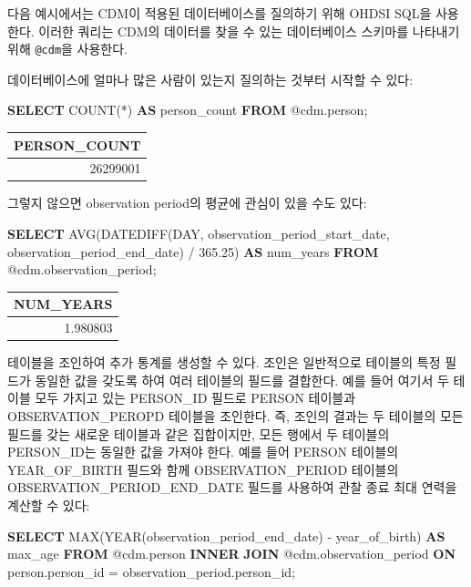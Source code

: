 \documentclass[11pt]{book}
\newenvironment{Shaded}{\begin{snugshade}}{\end{snugshade}}
\newcommand{\KeywordTok}[1]{\textcolor[rgb]{0.13,0.29,0.53}{\textbf{#1}}}
\newcommand{\DataTypeTok}[1]{\textcolor[rgb]{0.13,0.29,0.53}{#1}}
\newcommand{\FloatTok}[1]{\textcolor[rgb]{0.00,0.00,0.81}{#1}}
\newcommand{\FunctionTok}[1]{\textcolor[rgb]{0.00,0.00,0.00}{#1}}
\newcommand{\NormalTok}[1]{#1}
\theoremstyle{definition}
\theoremstyle{definition}
\theoremstyle{definition}
\theoremstyle{remark}
\begin{document}
다음 예시에서는 CDM이 적용된 데이터베이스를 질의하기 위해 OHDSI SQL을
사용한다. 이러한 쿼리는 CDM의 데이터를 찾을 수 있는 데이터베이스
스키마를 나타내기 위해 \texttt{@cdm}을 사용한다.

데이터베이스에 얼마나 많은 사람이 있는지 질의하는 것부터 시작할 수 있다:

\begin{Shaded}
\begin{Highlighting}[]
\KeywordTok{SELECT} \FunctionTok{COUNT}\NormalTok{(*) }\KeywordTok{AS}\NormalTok{ person_count }\KeywordTok{FROM}\NormalTok{ @cdm.person;}
\end{Highlighting}
\end{Shaded}

\begin{longtable}[]{@{}r@{}}
\toprule
PERSON\_COUNT\tabularnewline
\midrule
\endhead
26299001\tabularnewline
\bottomrule
\end{longtable}

그렇지 않으면 observation period의 평균에 관심이 있을 수도 있다:

\begin{Shaded}
\begin{Highlighting}[]
\KeywordTok{SELECT} \FunctionTok{AVG}\NormalTok{(DATEDIFF(}\DataTypeTok{DAY}\NormalTok{, }
\NormalTok{                    observation_period_start_date, }
\NormalTok{                    observation_period_end_date) / }\FloatTok{365.25}\NormalTok{) }\KeywordTok{AS}\NormalTok{ num_years}
\KeywordTok{FROM}\NormalTok{ @cdm.observation_period;}
\end{Highlighting}
\end{Shaded}

\begin{longtable}[]{@{}r@{}}
\toprule
NUM\_YEARS\tabularnewline
\midrule
\endhead
1.980803\tabularnewline
\bottomrule
\end{longtable}

테이블을 조인하여 추가 통계를 생성할 수 있다. 조인은 일반적으로 테이블의
특정 필드가 동일한 값을 갖도록 하여 여러 테이블의 필드를 결합한다. 예를
들어 여기서 두 테이블 모두 가지고 있는 PERSON\_ID 필드로 PERSON 테이블과
OBSERVATION\_PEROPD 테이블을 조인한다. 즉, 조인의 결과는 두 테이블의
모든 필드를 갖는 새로운 테이블과 같은 집합이지만, 모든 행에서 두
테이블의 PERSON\_ID는 동일한 값을 가져야 한다. 예를 들어 PERSON 테이블의
YEAR\_OF\_BIRTH 필드와 함께 OBSERVATION\_PERIOD 테이블의
OBSERVATION\_PERIOD\_END\_DATE 필드를 사용하여 관찰 종료 최대 연력을
계산할 수 있다:

\begin{Shaded}
\begin{Highlighting}[]
\KeywordTok{SELECT} \FunctionTok{MAX}\NormalTok{(}\DataTypeTok{YEAR}\NormalTok{(observation_period_end_date) -}
\NormalTok{           year_of_birth) }\KeywordTok{AS}\NormalTok{ max_age}
\KeywordTok{FROM}\NormalTok{ @cdm.person}
\KeywordTok{INNER} \KeywordTok{JOIN}\NormalTok{ @cdm.observation_period}
  \KeywordTok{ON}\NormalTok{ person.person_id = observation_period.person_id;}
\end{Highlighting}
\end{Shaded}
\end{document}
